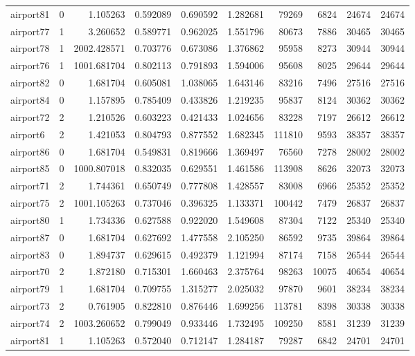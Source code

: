 \begin{longtable}{|l|r|r|r|r|r|r|r|r|r|}
airport81 & 0 & 1.105263 & 0.592089 & 0.690592 & 1.282681 & 79269 & 6824 & 24674 & 24674 \\
airport77 & 1 & 3.260652 & 0.589771 & 0.962025 & 1.551796 & 80673 & 7886 & 30465 & 30465 \\
airport78 & 1 & 2002.428571 & 0.703776 & 0.673086 & 1.376862 & 95958 & 8273 & 30944 & 30944 \\
airport76 & 1 & 1001.681704 & 0.802113 & 0.791893 & 1.594006 & 95608 & 8025 & 29644 & 29644 \\
airport82 & 0 & 1.681704 & 0.605081 & 1.038065 & 1.643146 & 83216 & 7496 & 27516 & 27516 \\
airport84 & 0 & 1.157895 & 0.785409 & 0.433826 & 1.219235 & 95837 & 8124 & 30362 & 30362 \\
airport72 & 2 & 1.210526 & 0.603223 & 0.421433 & 1.024656 & 83228 & 7197 & 26612 & 26612 \\
airport6 & 2 & 1.421053 & 0.804793 & 0.877552 & 1.682345 & 111810 & 9593 & 38357 & 38357 \\
airport86 & 0 & 1.681704 & 0.549831 & 0.819666 & 1.369497 & 76560 & 7278 & 28002 & 28002 \\
airport85 & 0 & 1000.807018 & 0.832035 & 0.629551 & 1.461586 & 113908 & 8626 & 32073 & 32073 \\
airport71 & 2 & 1.744361 & 0.650749 & 0.777808 & 1.428557 & 83008 & 6966 & 25352 & 25352 \\
airport75 & 2 & 1001.105263 & 0.737046 & 0.396325 & 1.133371 & 100442 & 7479 & 26837 & 26837 \\
airport80 & 1 & 1.734336 & 0.627588 & 0.922020 & 1.549608 & 87304 & 7122 & 25340 & 25340 \\
airport87 & 0 & 1.681704 & 0.627692 & 1.477558 & 2.105250 & 86592 & 9735 & 39864 & 39864 \\
airport83 & 0 & 1.894737 & 0.629615 & 0.492379 & 1.121994 & 87174 & 7158 & 26544 & 26544 \\
airport70 & 2 & 1.872180 & 0.715301 & 1.660463 & 2.375764 & 98263 & 10075 & 40654 & 40654 \\
airport79 & 1 & 1.681704 & 0.709755 & 1.315277 & 2.025032 & 97870 & 9601 & 38234 & 38234 \\
airport73 & 2 & 0.761905 & 0.822810 & 0.876446 & 1.699256 & 113781 & 8398 & 30338 & 30338 \\
airport74 & 2 & 1003.260652 & 0.799049 & 0.933446 & 1.732495 & 109250 & 8581 & 31239 & 31239 \\
airport81 & 1 & 1.105263 & 0.572040 & 0.712147 & 1.284187 & 79287 & 6842 & 24701 & 24701 \\

\end{longtable}
